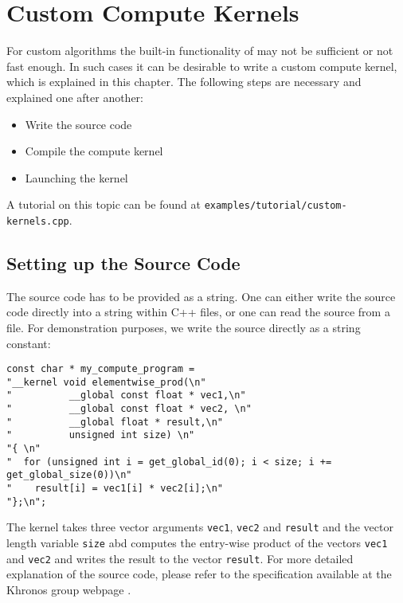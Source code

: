 

\chapter{Custom Compute Kernels} \label{chap:custom}

For custom algorithms the built-in functionality of {\ViennaCL} may not be sufficient or not fast enough. In such cases it can be desirable to write a custom {\OpenCL} compute kernel, which is explained in this chapter. The following steps are necessary and explained one after another:
\begin{itemize}
 \item Write the {\OpenCL} source code
 \item Compile the compute kernel
 \item Launching the kernel
\end{itemize}
A tutorial on this topic can be found at \texttt{examples/tutorial/custom-kernels.cpp}.

\section{Setting up the Source Code}
The {\OpenCL} source code has to be provided as a string. One can either write the source code directly into a string within C++ files, or one can read the {\OpenCL} source from a file. For demonstration purposes, we write the source directly as a string constant:
\begin{lstlisting}
const char * my_compute_program = 
"__kernel void elementwise_prod(\n"
"          __global const float * vec1,\n"
"          __global const float * vec2, \n"
"          __global float * result,\n"
"          unsigned int size) \n"
"{ \n"
"  for (unsigned int i = get_global_id(0); i < size; i += get_global_size(0))\n"
"    result[i] = vec1[i] * vec2[i];\n"
"};\n";
\end{lstlisting}
The kernel takes three vector arguments \lstinline{vec1}, \lstinline{vec2} and \lstinline{result} and the vector length variable \lstinline{size} abd computes the entry-wise product of the vectors \lstinline|vec1| and \lstinline|vec2| and writes the result to the vector \lstinline|result|. For more detailed explanation of the {\OpenCL} source code, please refer to the specification available at the Khronos group webpage \cite{khronoscl}.

